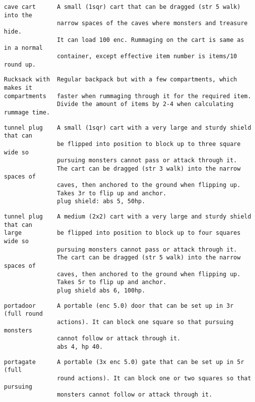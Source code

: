 \small \begin{samepage} \begin{verbatim}
cave cart      A small (1sqr) cart that can be dragged (str 5 walk) into the
               narrow spaces of the caves where monsters and treasure hide.
               It can load 100 enc. Rummaging on the cart is same as in a normal
               container, except effective item number is items/10 round up.
\end{verbatim} \blocklistgap \begin{verbatim}
Rucksack with  Regular backpack but with a few compartments, which makes it
compartments   faster when rummaging through it for the required item.
               Divide the amount of items by 2-4 when calculating rummage time.
\end{verbatim} \blocklistgap \begin{verbatim}
tunnel plug    A small (1sqr) cart with a very large and sturdy shield that can
               be flipped into position to block up to three square wide so
               pursuing monsters cannot pass or attack through it.
               The cart can be dragged (str 3 walk) into the narrow spaces of
               caves, then anchored to the ground when flipping up.
               Takes 3r to flip up and anchor.
               plug shield: abs 5, 50hp.
\end{verbatim} \blocklistgap \begin{verbatim}
tunnel plug    A medium (2x2) cart with a very large and sturdy shield that can
large          be flipped into position to block up to four squares wide so
               pursuing monsters cannot pass or attack through it.
               The cart can be dragged (str 5 walk) into the narrow spaces of
               caves, then anchored to the ground when flipping up.
               Takes 5r to flip up and anchor.
               plug shield abs 6, 100hp.
\end{verbatim} \blocklistgap \begin{verbatim}
portadoor      A portable (enc 5.0) door that can be set up in 3r (full round
               actions). It can block one square so that pursuing monsters
               cannot follow or attack through it.
               abs 4, hp 40.
\end{verbatim} \blocklistgap \begin{verbatim}
portagate      A portable (3x enc 5.0) gate that can be set up in 5r (full
               round actions). It can block one or two squares so that pursuing
               monsters cannot follow or attack through it.

\end{verbatim}
\end{samepage}
